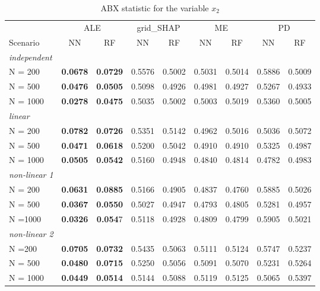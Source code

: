 \begin{table}[ht]
\caption{ABX statistic for the variable $x_2$}
\label{tbl:exp1_v2}
\centering
{}
\begin{tabular}{l|cc|cc|cc|cc}
\toprule
{} & \multicolumn{2}{|c}{ALE} & \multicolumn{2}{|c}{grid\_SHAP} & \multicolumn{2}{|c}{ME} & \multicolumn{2}{|c}{PD} \\
Scenario& NN & RF & NN & RF & NN & RF & NN & RF \\
\midrule
\textit{independent} & & & & & & & & \\
N = 200 &\textbf{0.0678}	&\textbf{0.0729}	&0.5576	&0.5002	&0.5031	&0.5014	&0.5886	&0.5009 \\
N = 500 &\textbf{0.0476}	&\textbf{0.0505}	&0.5098	&0.4926	&0.4981	&0.4927	&0.5267	&0.4933 \\ 
N = 1000 &\textbf{0.0278} &\textbf{0.0475} &0.5035	&0.5002	&0.5003	&0.5019	&0.5360	&0.5005 \\
\midrule
\textit{linear} & & & & & & & & \\
N = 200 &\textbf{0.0782}	&\textbf{0.0726}	&0.5351	&0.5142	&0.4962	&0.5016	&0.5036	&0.5072\\
N = 500 &\textbf{0.0471}	&\textbf{0.0618	}&0.5200	&0.5042	&0.4910	&0.4910	&0.5325	&0.4987\\  
N = 1000 &\textbf{0.0505} &\textbf{0.0542} &0.5160 &0.4948 &0.4840	&0.4814	&0.4782	&0.4983 \\
\midrule
\textit{non-linear 1}& & & & & & & & \\
N = 200 &\textbf{0.0631}	&\textbf{0.0885}	&0.5166	&0.4905	&0.4837	&0.4760	&0.5885	&0.5026 \\
N = 500 &\textbf{0.0367}	&\textbf{0.0550}	&0.5027	&0.4947	&0.4793	&0.4805	&0.5281	&0.4957\\
N =1000 &\textbf{0.0326}	&\textbf{0.054}7	&0.5118	&0.4928	&0.4809	&0.4799	&0.5905	&0.5021 \\
\midrule
\textit{non-linear 2} & & & & & & & & \\
N =200 &\textbf{0.0705}	&\textbf{0.0732}	&0.5435	&0.5063	&0.5111	&0.5124	&0.5747	&0.5237 \\
N = 500 &\textbf{0.0480}	&\textbf{0.0715}	&0.5250	&0.5056	&0.5091	&0.5070	&0.5231	&0.5264 \\ 
N = 1000 &\textbf{0.0449} &\textbf{0.0514} &0.5144 &0.5088 &0.5119 &0.5125	&0.5065	&0.5397  \\
\bottomrule
\end{tabular}
\end{table}



